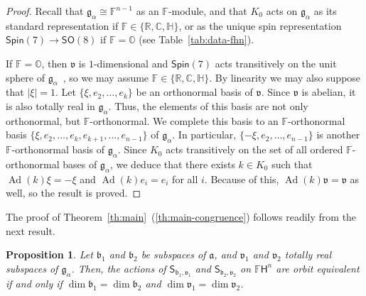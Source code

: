 \documentclass[12pt, a4paper]{amsart}
\newcommand{\g}{\mathfrak}
\newcommand{\s}{\mathsf}
\newcommand{\R}{\mathbb{R}}
\newcommand{\C}{\mathbb{C}}
\renewcommand{\H}{\mathbb{H}}
\renewcommand{\O}{\mathbb{O}}
\newcommand{\F}{\mathbb{F}}
\newcommand{\Ad}{\operatorname{Ad}}
\newtheorem{proposition}[theorem]{Proposition}
\theoremstyle{definition}
\begin{document}
\begin{proof}
Recall that $\g{g}_\alpha\cong\F^{n-1}$ as an $\F$-module, 
and that $K_0$ acts on $\g{g}_\alpha$ as its standard representation if $\F\in\{\R,\C,\H\}$,
or as the unique spin representation $\s{Spin}(7)\to\s{SO}(8)$ if $\F=\O$ (see Table~\ref{tab:data-fhn}).

If $\F=\O$, then $\g{v}$ is $1$-dimensional and 
$\s{Spin}(7)$ acts transitively on the unit sphere of $\g{g}_\alpha$~\cite{Borel50},
so we may assume $\F\in\{\R,\C,\H\}$. 
By linearity we may also suppose that $\lvert\xi\rvert=1$.
Let $\{\xi,e_2,\dots,e_k\}$ be an orthonormal basis of $\g{v}$.
Since $\g{v}$ is abelian, it is also totally real in $\g{g}_\alpha$.
Thus, the elements of this basis are not only orthonormal, but $\F$-orthonormal.
We complete this basis to an $\F$-orthonormal basis 
$\{\xi,e_2,\dots,e_k,e_{k+1},\dots,e_{n-1}\}$ of $\g{g}_\alpha$.
In particular, $\{-\xi,e_2,\dots,e_{n-1}\}$ is another $\F$-orthonormal basis of $\g{g}_\alpha$.
Since $K_0$ acts transitively on the set of all ordered $\F$-orthonormal bases of $\g{g}_\alpha$,
we deduce that there exists $k\in K_0$ such that $\Ad(k)\xi=-\xi$ and $\Ad(k)e_i=e_i$ for all $i$.
Because of this, $\Ad(k)\g{v}=\g{v}$ as well, so the result is proved. \qedhere
\end{proof}

The proof of Theorem~\ref{th:main}~(\ref{th:main-congruence}) follows readily from the next result.

\begin{proposition}
Let $\g{b}_1$ and $\g{b}_2$ be subspaces of $\g{a}$, 
and $\g{v}_1$ and $\g{v}_2$ totally real subspaces of $\g{g}_\alpha$.
Then, the actions of $\s{S}_{\g{b}_1,\g{v}_1}$ and $\s{S}_{\g{b}_2,\g{v}_2}$ on $\F\s{H}^n$ 
are orbit equivalent 
if and only if $\dim\g{b}_1=\dim\g{b}_2$ and $\dim\g{v}_1=\dim\g{v}_2$.
\end{proposition}
\end{document}
